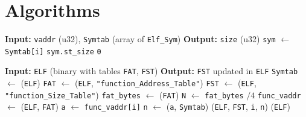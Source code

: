 \section{Algorithms}

\begin{algorithm}[H]
\caption{\texttt{func\_size\_by\_vaddr(vaddr, Symtab)} — Linear scan of \texttt{.symtab}}
\label{alg:func-size-by-vaddr}
\begin{algorithmic}[1]
\State \textbf{Input:} \texttt{vaddr} (u32), \texttt{Symtab} (array of \texttt{Elf\_Sym})
\State \textbf{Output:} \texttt{size} (u32)
  \State \texttt{sym} $\gets$ \texttt{Symtab[i]}
      
      \State \Return \texttt{sym.st\_size}
    \EndIf
  \EndIf
\EndFor
\State \Return \texttt{0} 
\end{algorithmic}
\end{algorithm}

\begin{algorithm}[H]
\caption{\texttt{populate\_fst(ELF)} — Fill Function Size Table (FST) from FAT via \texttt{.symtab}}
\label{alg:populate-fst}
\begin{algorithmic}[1]
\State \textbf{Input:} \texttt{ELF} (binary with tables \texttt{FAT}, \texttt{FST})
\State \textbf{Output:} \texttt{FST} updated in \texttt{ELF}
\State \texttt{Symtab} $\gets$ (\texttt{ELF}) 
\State \texttt{FAT}    $\gets$ (\texttt{ELF}, \texttt{"function\_Address\_Table"})
\State \texttt{FST}    $\gets$ (\texttt{ELF}, \texttt{"function\_Size\_Table"})
\State \texttt{fat\_bytes} $\gets$ (\texttt{FAT})
\State \texttt{N} $\gets$ \texttt{fat\_bytes} $/ 4$ 
\State \texttt{func\_vaddr} $\gets$ (\texttt{ELF}, \texttt{FAT}) 
  \State \texttt{a} $\gets$ \texttt{func\_vaddr[i]} 
  \State \texttt{n} $\gets$ (\texttt{a}, \texttt{Symtab}) 
  \State {}(\texttt{ELF}, \texttt{FST}, \texttt{i}, \texttt{n})
\EndFor
\State {}(\texttt{ELF})
\end{algorithmic}
\end{algorithm}

